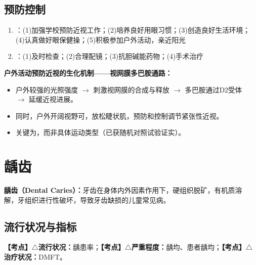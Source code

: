 \subsection{预防控制}

\begin{keybox}
\begin{enumerate}[leftmargin=*]
    \item {}：(1)加强学校预防近视工作；(2)培养良好用眼习惯；(3)创造良好生活环境；(4)认真做好眼保健操；(5)积极参加户外活动，亲近阳光
    \item {}：(1)及时检查；(2)合理配镜；(3)抗胆碱能药物；(4)手术治疗
\end{enumerate}

\vspace{4pt}
\textbf{户外活动预防近视的生化机制——视网膜多巴胺通路：}
\begin{itemize}[leftmargin=*]
    \item 户外较强的光照强度 $\rightarrow$ 刺激视网膜的合成与释放 $\rightarrow$ 多巴胺通过D2受体 $\rightarrow$ 延缓近视进展。
    \item 同时，户外开阔视野可，放松睫状肌，预防和控制调节紧张性近视。
    \item 关键为，而非具体运动类型（已获随机对照试验证实）。
\end{itemize}
\end{keybox}

\section{龋齿}

\begin{defbox}
\textbf{龋齿（Dental Caries）：}牙齿在身体内外因素作用下，硬组织脱矿，有机质溶解，牙组织进行性破坏，导致牙齿缺损的儿童常见病。
\end{defbox}

\subsection{流行状况与指标}

\begin{keybox}
\textbf{【考点】$\triangle$流行状况：}龋患率；\textbf{【考点】$\triangle$严重程度：}龋均、患者龋均；\textbf{【考点】$\triangle$治疗状况：}DMFT。
\end{keybox}

